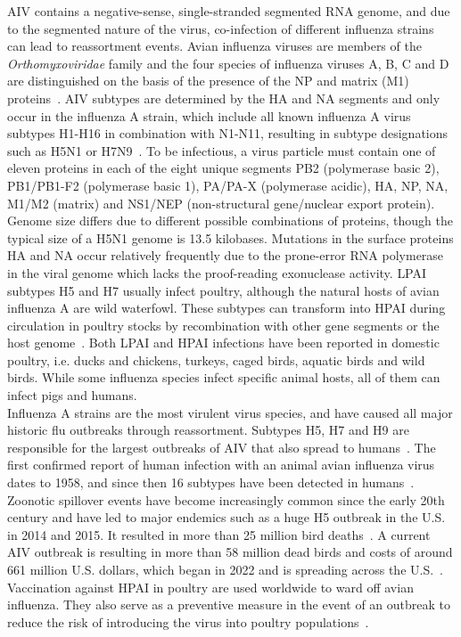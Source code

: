 \ac{AIV} contains a negative-sense, single-stranded segmented \ac{RNA} genome, and due to the segmented nature of the virus, co-infection of different influenza strains can lead to reassortment events. Avian influenza viruses are members of the \textit{Orthomyxoviridae} family and the four species of influenza viruses A, B, C and D are distinguished on the basis of the presence of the \ac{NP} and matrix (M1) proteins~\cite{webster1992evolution}. \ac{AIV} subtypes are determined by the \ac{HA} and \ac{NA} segments and only occur in the influenza A strain, which include all known influenza A virus subtypes H1-H16 in combination with N1-N11, resulting in subtype designations such as H5N1 or H7N9~\cite{webster1992evolution, krammer2018influenza}. To be infectious, a virus particle must contain one of eleven proteins in each of the eight unique segments PB2 (polymerase basic 2), PB1/PB1-F2 (polymerase basic 1), PA/PA-X (polymerase acidic), \ac{HA}, \ac{NP}, \ac{NA}, M1/M2 (matrix) and NS1/NEP (non-structural gene/nuclear export protein). Genome size differs due to different possible combinations of proteins, though the typical size of a H5N1 genome is 13.5 kilobases. Mutations in the surface proteins \ac{HA} and \ac{NA} occur relatively frequently due to the prone-error \ac{RNA} polymerase in the viral genome which lacks the proof-reading exonuclease activity. \ac{LPAI} subtypes H5 and H7 usually infect poultry, although the natural hosts of avian influenza A are wild waterfowl. These subtypes can transform into \ac{HPAI} during circulation in poultry stocks by recombination with other gene segments or the host genome~\cite{webster2006h5n1}. Both \ac{LPAI} and \ac{HPAI} infections have been reported in domestic poultry, i.e. ducks and chickens, turkeys, caged birds, aquatic birds and wild birds. While some influenza species infect specific animal hosts, all of them can infect pigs and humans. \\
Influenza A strains are the most virulent virus species, and have caused all major historic flu outbreaks through reassortment. Subtypes H5, H7 and H9 are responsible for the largest outbreaks of \ac{AIV} that also spread to humans~\cite{widdowson2017global}. The first confirmed report of human infection with an animal avian influenza virus dates to 1958, and since then 16 subtypes have been detected in humans~\cite{kluska1961demonstration}. Zoonotic spillover events have become increasingly common since the early 20th century and have led to major endemics such as a huge H5 outbreak in the U.S. in 2014 and 2015. It resulted in more than 25 million bird deaths~\cite{seeger2021poultry}. A current \ac{AIV} outbreak is resulting in more than 58 million dead birds and costs of around 661 million U.S. dollars, which began in 2022 and is spreading across the U.S.~\cite{usda2023hpai}. 
Vaccination against \ac{HPAI} in poultry are used worldwide to ward off avian influenza. They also serve as a preventive measure in the event of an outbreak to reduce the risk of introducing the virus into poultry populations~\cite{swayne2013current, swayne2011assessment}. 

